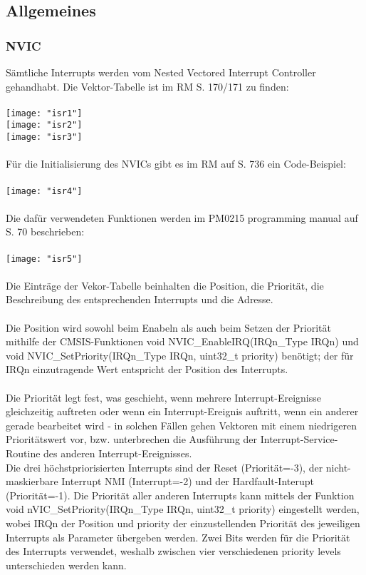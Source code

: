 \documentclass[11pt]{report}
\begin{document}
		\subsection{Allgemeines}
			\subsubsection{NVIC}
				Sämtliche Interrupts werden vom Nested Vectored Interrupt Controller gehandhabt. Die Vektor-Tabelle ist im RM S. 170/171 zu finden:\\
				\\\texttt{[image: "isr1"]}\\
				\texttt{[image: "isr2"]}\\
				\texttt{[image: "isr3"]}\\
				\\Für die Initialisierung des NVICs gibt es im RM auf S. 736 ein Code-Beispiel:\\
				\\\texttt{[image: "isr4"]}\\
				\\Die dafür verwendeten Funktionen werden im PM0215 programming manual auf S. 70 beschrieben:\\
				\\\texttt{[image: "isr5"]}\\
				\\Die Einträge der Vekor-Tabelle beinhalten die Position, die Priorität, die Beschreibung des entsprechenden Interrupts und die Adresse.\\
				\\Die Position wird sowohl beim Enabeln als auch beim Setzen der Priorität mithilfe der CMSIS-Funktionen void NVIC\_EnableIRQ(IRQn\_Type IRQn) und void NVIC\_SetPriority(IRQn\_Type IRQn, uint32\_t priority) benötigt; der für IRQn einzutragende Wert entspricht der Position des Interrupts.\\
				\\Die Priorität legt fest, was geschieht, wenn mehrere Interrupt-Ereignisse gleichzeitig auftreten oder wenn ein Interrupt-Ereignis auftritt, wenn ein anderer gerade bearbeitet wird - in solchen Fällen gehen Vektoren mit einem niedrigeren Prioritätswert vor, bzw. unterbrechen die Ausführung der Interrupt-Service-Routine des anderen Interrupt-Ereignisses.\\
				Die drei höchstpriorisierten Interrupts sind der Reset (Priorität=-3), der nicht-maskierbare Interrupt NMI (Interrupt=-2) und der Hardfault-Interupt (Priorität=-1). Die Priorität aller anderen Interrupts kann mittels der Funktion void nVIC\_SetPriority(IRQn\_Type IRQn, uint32\_t priority) eingestellt werden, wobei IRQn der Position und priority der einzustellenden Priorität des jeweiligen Interrupts als Parameter übergeben werden. Zwei Bits werden für die Priorität des Interrupts verwendet, weshalb zwischen vier verschiedenen priority levels unterschieden werden kann.\\
\end{document}
